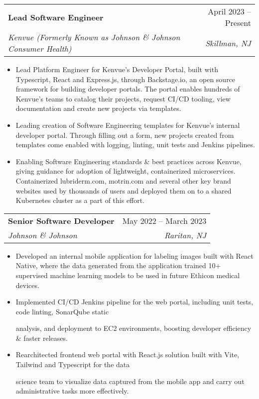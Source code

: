 \documentclass[letterpaper,11pt]{article}
\makeatletter
\newcommand{\resumeItem}[1]{
  \item\small{
    {#1 \vspace{-2pt}}
  }
}
\newcommand{\resumeSubheading}[4]{
  \vspace{-2pt}\item
    \begin{tabular*}{0.95\textwidth}[t]{l@{\extracolsep{\fill}}r}
      \textbf{#1} & #2 \\
      \textit{\small#3} & \textit{\small #4} \\
    \end{tabular*}\vspace{-7pt}
}
\newcommand{\resumeItemListStart}{\begin{itemize}}
\newcommand{\resumeItemListEnd}{\end{itemize}\vspace{-7pt}}
\makeatother
\begin{document}
    \resumeSubheading
      {Lead Software Engineer}{April 2023 -- Present}
      {Kenvue (Formerly Known as Johnson \& Johnson Consumer Health)}{Skillman, NJ}
      \resumeItemListStart
        \resumeItem{Lead Platform Engineer for Kenvue's Developer Portal, built with Typescript, React and Express.js, through Backstage.io, an open source framework for building developer portals. The portal enables hundreds of Kenvue's teams to catalog their projects, request CI/CD tooling, view documentation and create new projects via templates. }
        \resumeItem{Leading creation of Software Engineering templates for Kenvue's internal developer portal. Through filling out
         a form, new projects created from templates come enabled with logging, linting, unit tests and Jenkins pipelines.}
        \resumeItem{Enabling Software Engineering standards \& best practices across Kenvue, giving guidance  
        for adoption of lightweight, containerized microservices. Containerized lubriderm.com, motrin.com and several other
        key brand websites used by thousands of users and deployed them on to a shared Kubernetes cluster as a part of this effort. }
    \resumeItemListEnd

    \resumeSubheading
      {Senior Software Developer}{May 2022 -- March 2023}
      {Johnson \& Johnson}{Raritan, NJ}
      \resumeItemListStart
        \resumeItem{Developed an internal mobile application for labeling images built with React Native, where the data generated from the application trained 10+ supervised machine learning models to be used in future Ethicon medical devices.}
        \resumeItem{Implemented CI/CD Jenkins pipeline for the web portal, including unit tests, code linting, SonarQube static 
        
        analysis, and deployment to EC2 environments, boosting developer efficiency \& faster releases.}
        \resumeItem{Rearchitected frontend web portal with React.js solution built with Vite, Tailwind and Typescript for the data
        
         science team to visualize data captured from the mobile app and carry out administrative tasks more effectively.}
      \resumeItemListEnd
\end{document}
